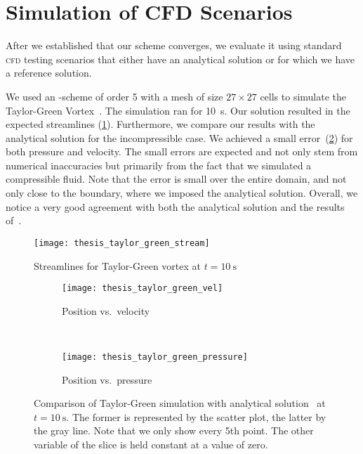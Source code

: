 \section{Simulation of CFD Scenarios}\label{sec:cfd}
After we established that our scheme converges, we evaluate it using standard \textsc{cfd} testing scenarios that either have an analytical solution or for which we have a reference solution.

We used an \aderdg{}-scheme of order 5 with a mesh of size $27 \times 27$ cells to simulate the Taylor-Green Vortex~.
The simulation ran for \SI{10}{\s}.
Our solution resulted in the expected streamlines (\cref{fig:taylor-green-streamlines}).
Furthermore, we compare our results with the analytical solution for the incompressible case.
We achieved a small error~(\cref{fig:taylor-green-result}) for both pressure and velocity.
The small errors are expected and not only stem from numerical inaccuracies but primarily from the fact that we simulated a compressible fluid.
Note that the error is small over the entire domain, and not only close to the boundary, where we imposed the analytical solution.
Overall, we notice a very good agreement with both the analytical solution and the results of~\cite{dumbser2016high}.

\begin{figure}[htb]
  \centering
  \texttt{[image: thesis\_taylor\_green\_stream]}
  \caption{\label{fig:taylor-green-streamlines}%
    Streamlines for Taylor-Green vortex at $t=\SI{10}{\s}$}
\end{figure}

\begin{figure}[htb]
  \centering
  \begin{subfigure}[t]{0.5\textwidth}
    \centering
    \texttt{[image: thesis\_taylor\_green\_vel]}
    \caption{Position vs.\ velocity}
  \end{subfigure}~%
  \begin{subfigure}[t]{0.5\textwidth}
    \centering
    \texttt{[image: thesis\_taylor\_green\_pressure]}
    \caption{Position vs.\ pressure}
  \end{subfigure}
  \caption{\label{fig:taylor-green-result}%
    Comparison of Taylor-Green simulation with analytical solution~ at $t=\SI{10}{\s}$.
    The former is represented by the scatter plot, the latter by the gray line.
    Note that we only show every 5th point.
    The other variable of the slice is held constant at a value of zero.}
\end{figure}

